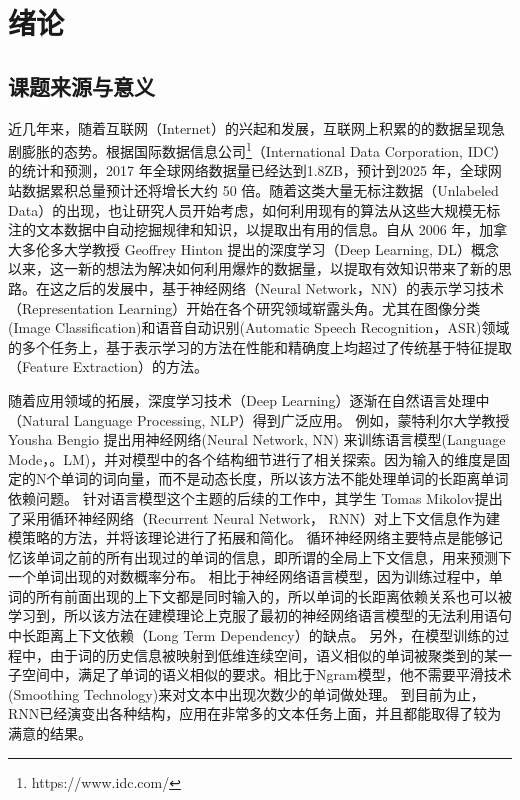 \chapter{绪论}
\section{课题来源与意义}
近几年来，随着互联网（Internet）的兴起和发展，互联网上积累的的数据呈现急剧膨胀的态势。根据国际数据信息公司\footnote{https://www.idc.com/}（International Data Corporation, IDC）的统计和预测，2017 年全球网络数据量已经达到1.8ZB，预计到2025 年，全球网站数据累积总量预计还将增长大约 50 倍。随着这类大量无标注数据（Unlabeled Data）的出现，也让研究人员开始考虑，如何利用现有的算法从这些大规模无标注的文本数据中自动挖掘规律和知识，以提取出有用的信息。自从 2006 年，加拿大多伦多大学教授 Geoffrey Hinton 提出的深度学习（Deep Learning, DL）概念以来，这一新的想法为解决如何利用爆炸的数据量，以提取有效知识带来了新的思路。在这之后的发展中，基于神经网络（Neural Network，NN）的表示学习技术（Representation Learning）开始在各个研究领域崭露头角。尤其在图像分类(Image Classification)和语音自动识别(Automatic Speech Recognition，ASR)领域的多个任务上，基于表示学习的方法在性能和精确度上均超过了传统基于特征提取（Feature Extraction）的方法。

随着应用领域的拓展，深度学习技术（Deep Learning）逐渐在自然语言处理中（Natural Language Processing, NLP）得到广泛应用。 例如，蒙特利尔大学教授 Yousha Bengio 提出用神经网络(Neural Network, NN) 来训练语言模型(Language Mode，。LM)，并对模型中的各个结构细节进行了相关探索。因为输入的维度是固定的N个单词的词向量，而不是动态长度，所以该方法不能处理单词的长距离单词依赖问题。
针对语言模型这个主题的后续的工作中，其学生 Tomas Mikolov提出了采用循环神经网络（Recurrent Neural Network， RNN）对上下文信息作为建模策略的方法，并将该理论进行了拓展和简化。
循环神经网络主要特点是能够记忆该单词之前的所有出现过的单词的信息，即所谓的全局上下文信息，用来预测下一个单词出现的对数概率分布。
相比于神经网络语言模型，因为训练过程中，单词的所有前面出现的上下文都是同时输入的，所以单词的长距离依赖关系也可以被学习到，所以该方法在建模理论上克服了最初的神经网络语言模型的无法利用语句中长距离上下文依赖（Long Term Dependency）的缺点。
另外，在模型训练的过程中，由于词的历史信息被映射到低维连续空间，语义相似的单词被聚类到的某一子空间中，满足了单词的语义相似的要求。相比于Ngram模型，他不需要平滑技术(Smoothing Technology)来对文本中出现次数少的单词做处理。
到目前为止，RNN已经演变出各种结构，应用在非常多的文本任务上面，并且都能取得了较为满意的结果。

